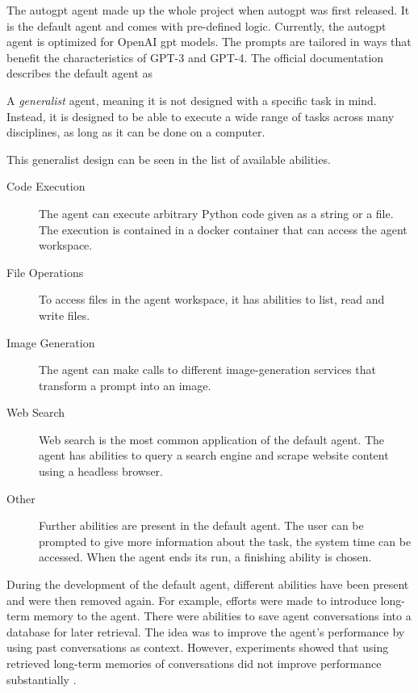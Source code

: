 \documentclass[../main.tex]{subfiles}
\begin{document}
The \gls{autogpt} agent made up the whole project when \gls{autogpt} was first released.
It is the default agent and comes with pre-defined logic.
Currently,
the \gls{autogpt} agent is optimized for OpenAI \gls{gpt} models.
The prompts are tailored in ways
that benefit the characteristics of GPT-3 and GPT-4.
The official documentation describes the default agent as
\begin{displayquote}
      A \emph{generalist} agent, meaning it is not designed with a specific task in mind.
      Instead, it is designed to be able to execute a wide range of tasks across many disciplines,
      as long as it can be done on a computer.
\end{displayquote}
This generalist design can be seen in the list of available abilities.
\begin{description}
      \item[Code Execution] The agent can execute arbitrary Python code given as a
            string or a file.
            The execution is contained in a docker container
            that can access the agent workspace.
      \item[File Operations] To access files in the agent workspace,
            it has abilities to list, read and write files.
      \item[Image Generation]
            The agent can make calls to different image-generation services
            that transform a prompt into an image.
      \item[Web Search]
            Web search is the most common application of the default agent.
            The agent has abilities to query a search engine
            and scrape website content using a headless browser.
      \item[Other]
            Further abilities are present in the default agent.
            The user can be prompted to give more information about the task,
            the system time can be accessed.
            When the agent ends its run, a finishing ability is chosen.
\end{description}

During the development of the default agent,
different abilities have been present and were then removed again.
For example, efforts were made to introduce long-term memory to the agent.
There were abilities to save agent conversations into a database for later retrieval.
The idea was to improve the agent's performance by using past conversations as context.
However, experiments showed that using retrieved long-term memories of
conversations did not improve performance substantially \cite{Pwuts}.
\end{document}
